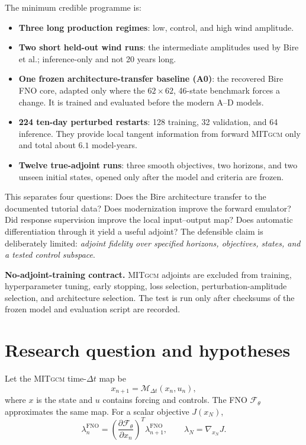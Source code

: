 \documentclass[11pt]{article}
\newcommand{\MITgcm}{\textsc{MITgcm}}
\newenvironment{contractbox}
  {\begin{center}\begin{lrbox}{\contractstore}\begin{minipage}{0.92\textwidth}}
  {\end{minipage}\end{lrbox}\setlength{\fboxsep}{8pt}%
   \fcolorbox{red}{warm}{\usebox{\contractstore}}\end{center}}
\begin{document}
The minimum credible programme is:
\begin{itemize}
\item \textbf{Three long production regimes}: low, control, and high wind amplitude.
\item \textbf{Two short held-out wind runs}: the intermediate amplitudes used by
Bire et al.; inference-only and not 20 years long.
\item \textbf{One frozen architecture-transfer baseline (A0)}: the recovered Bire FNO
core, adapted only where the \(62\times62\), 46-state benchmark forces a change. It is
trained and evaluated before the modern A--D models.
\item \textbf{224 ten-day perturbed restarts}: 128 training, 32 validation, and 64
inference. They provide local tangent information from forward \MITgcm{} only and total
about \(6.1\) model-years.
\item \textbf{Twelve true-adjoint runs}: three smooth objectives, two horizons, and
two unseen initial states, opened only after the model and criteria are frozen.
\end{itemize}

This separates four questions: Does the Bire architecture transfer to the documented
tutorial data? Does modernization improve the forward emulator? Did response supervision
improve the local input--output map? Does automatic differentiation through it yield a
useful adjoint? The defensible claim is deliberately limited: \emph{adjoint fidelity over
specified horizons, objectives, states, and a tested control subspace}.

\begin{contractbox}
\textbf{No-adjoint-training contract.} \MITgcm{} adjoints are excluded from training,
hyperparameter tuning, early stopping, loss selection, perturbation-amplitude selection,
and architecture selection. The test is run only after checksums of the frozen model and
evaluation script are recorded.
\end{contractbox}

\section{Research question and hypotheses}
Let the \MITgcm{} time-\(\Delta t\) map be
\[
x_{n+1}=\mathcal{M}_{\Delta t}(x_n,u_n),
\]
where \(x\) is the state and \(u\) contains forcing and controls. The FNO
\(\mathcal{F}_\theta\) approximates the same map. For a scalar objective \(J(x_N)\),
\[
\lambda_n^{\mathrm{FNO}}=
\left(\frac{\partial\mathcal{F}_\theta}{\partial x_n}\right)^{T}
\lambda_{n+1}^{\mathrm{FNO}},\qquad \lambda_N=\nabla_{x_N}J.
\]
\end{document}
